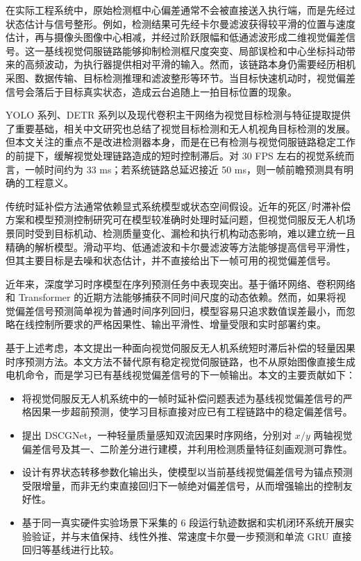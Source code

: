 \documentclass[journal]{IEEEtran}
\begin{document}
在实际工程系统中，原始检测框中心偏差通常不会被直接送入执行端，而是先经过状态估计与信号整形。例如，检测结果可先经卡尔曼滤波获得较平滑的位置与速度估计，再与摄像头图像中心相减，并经过阶跃限幅和低通滤波形成二维视觉偏差信号\cite{yilmaz2006object,kalman1960new,welch1995introduction}。这一基线视觉伺服链路能够抑制检测框尺度突变、局部误检和中心坐标抖动带来的高频波动，为执行器提供相对平滑的输入。然而，该链路本身仍需要经历相机采图、数据传输、目标检测推理和滤波整形等环节。当目标快速机动时，视觉偏差信号会落后于目标真实状态，造成云台追随上一拍目标位置的现象。

YOLO 系列、DETR 系列以及现代卷积主干网络为视觉目标检测与特征提取提供了重要基础\cite{redmon2016you,he2016deep,ren2015faster,bochkovskiy2020yolov4,carion2020detr}，相关中文研究也总结了视觉目标检测和无人机视角目标检测的发展\cite{cao2022survey_cn,leng2023droneview_cn}。但本文关注的重点不是改进检测器本身，而是在已有检测与视觉伺服链路稳定工作的前提下，缓解视觉处理链路造成的短时控制滞后。对 30 FPS 左右的视觉系统而言，一帧时间约为 33 ms；若系统链路总延迟接近 50 ms，则一帧前瞻预测具有明确的工程意义。

传统时延补偿方法通常依赖显式系统模型或状态空间假设。近年的死区/时滞补偿方案\cite{smith1957closer}和模型预测控制研究\cite{camacho2013model}可在模型较准确时处理时延问题，但视觉伺服反无人机场景同时受到目标机动、检测质量变化、漏检和执行机构动态影响，难以建立统一且精确的解析模型。滑动平均、低通滤波和卡尔曼滤波等方法能够提高信号平滑性，但其主要目标是去噪和状态估计，并不直接给出下一帧可用的视觉偏差信号。

近年来，深度学习时序模型在序列预测任务中表现突出\cite{lecun2015deep}。基于循环网络、卷积网络和 Transformer 的近期方法\cite{hochreiter1997long,cho2014learning,bai2018empirical,vaswani2017attention,lim2021tft,wen2023transformers}能够捕获不同时间尺度的动态依赖。然而，如果将视觉偏差信号预测简单视为普通时间序列回归，模型容易只追求数值误差最小，而忽略在线控制所要求的严格因果性、输出平滑性、增量受限和实时部署约束。

基于上述考虑，本文提出一种面向视觉伺服反无人机系统短时滞后补偿的轻量因果时序预测方法。本文方法不替代原有稳定视觉伺服链路，也不从原始图像直接生成电机命令，而是学习已有基线视觉偏差信号的下一帧输出。本文的主要贡献如下：
\begin{itemize}
    \item 将视觉伺服反无人机系统中的一帧时延补偿问题表述为基线视觉偏差信号的严格因果一步超前预测，使学习目标直接对应已有工程链路中的稳定偏差信号。
    \item 提出 DSCGNet，一种轻量质量感知双流因果时序网络，分别对 $x/y$ 两轴视觉偏差信号及其一、二阶差分进行建模，并利用检测质量特征刻画观测可靠性。
    \item 设计有界状态转移参数化输出头，使模型以当前基线视觉偏差信号为锚点预测受限增量，而非无约束直接回归下一帧绝对偏差信号，从而增强输出的控制友好性。
    \item 基于同一真实硬件实验场景下采集的 6 段运行轨迹数据和实机闭环系统开展实验验证，并与末值保持、线性外推、常速度卡尔曼一步预测和单流 GRU 直接回归等基线进行比较。
\end{itemize}
\end{document}
